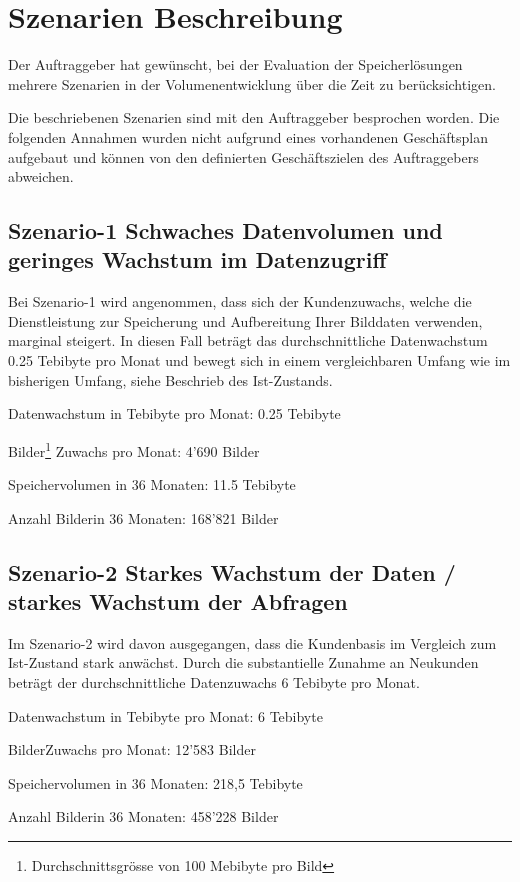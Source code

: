 
\cleardoublepage
\chapter{Szenarien Beschreibung}
Der Auftraggeber hat gewünscht, bei der Evaluation der Speicherlösungen mehrere Szenarien in der Volumenentwicklung über die Zeit zu berücksichtigen. 

Die beschriebenen Szenarien sind mit den Auftraggeber besprochen worden. Die folgenden Annahmen wurden nicht aufgrund eines vorhandenen Geschäftsplan aufgebaut und können von den definierten Geschäftszielen des Auftraggebers abweichen. 


\section{Szenario-1 Schwaches Datenvolumen und geringes Wachstum im Datenzugriff}\label{Szenario1}
Bei Szenario-1 wird angenommen, dass sich der Kundenzuwachs, welche die Dienstleistung zur Speicherung und Aufbereitung Ihrer Bilddaten verwenden, marginal steigert. In diesen Fall beträgt das durchschnittliche Datenwachstum 0.25 Tebibyte pro Monat und bewegt sich in einem vergleichbaren Umfang wie im bisherigen Umfang, siehe Beschrieb des Ist-Zustands.


Datenwachstum in Tebibyte pro Monat: 0.25 Tebibyte

Bilder\footnote{Durchschnittsgrösse von 100 Mebibyte pro Bild} Zuwachs pro Monat: 4'690 Bilder

Speichervolumen in 36 Monaten: 11.5 Tebibyte

Anzahl Bilder\footnotemark[\value{footnote}] in 36 Monaten: 168'821 Bilder

\section{Szenario-2 Starkes Wachstum der Daten / starkes Wachstum der Abfragen}
Im Szenario-2 wird davon ausgegangen, dass die Kundenbasis im Vergleich zum Ist-Zustand stark anwächst. Durch die substantielle Zunahme an Neukunden beträgt der durchschnittliche Datenzuwachs 6 Tebibyte pro Monat.


Datenwachstum in Tebibyte pro Monat: 6 Tebibyte

Bilder\footnotemark[\value{footnote}] Zuwachs pro Monat: 12'583 Bilder

Speichervolumen in 36 Monaten: 218,5 Tebibyte

Anzahl Bilder\footnotemark[\value{footnote}] in 36 Monaten: 458'228 Bilder
 
